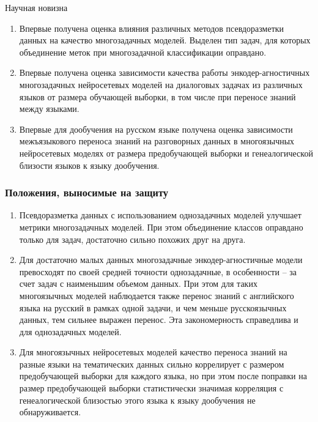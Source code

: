 \begin{frame}{Научная новизна}
\begin{enumerate}
  \item {Впервые получена оценка влияния различных методов псевдоразметки данных на качество многозадачных моделей. Выделен тип задач, для которых объединение меток при многозадачной классификации оправдано.}
  \item {Впервые получена  оценка зависимости качества  работы энкодер-агностичных многозадачных нейросетевых моделей на диалоговых задачах из различных языков от размера обучающей выборки, в том числе при переносе знаний между языками.}
  \item {Впервые для дообучения на русском языке получена оценка зависимости межъязыкового переноса знаний на разговорных данных в многоязычных нейросетевых моделях от размера предобучающей выборки и генеалогической близости языков к языку дообучения.}
\end{enumerate}    
\end{frame}

\begin{frame}
    \frametitle{Положения, выносимые на защиту}
    \begin{enumerate}
  \item {Псевдоразметка данных с использованием однозадачных моделей улучшает метрики многозадачных моделей. При этом объединение классов оправдано только для задач, достаточно сильно похожих друг на друга.}
  \item {Для достаточно малых данных многозадачные энкодер-агностичные модели превосходят по своей средней точности однозадачные, в особенности -- за счет задач с наименьшим объемом данных. При этом для таких многоязычных моделей наблюдается также перенос знаний с английского языка на русский в рамках одной задачи, и чем меньше русскоязычных данных, тем сильнее выражен перенос. Эта закономерность справедлива и для однозадачных моделей.}
  \item {Для многоязычных нейросетевых моделей качество переноса знаний на разные языки на тематических данных сильно коррелирует с размером предобучающей выборки для каждого языка, но при этом после поправки на размер предобучающей выборки статистически значимая корреляция с генеалогической близостью этого языка к языку дообучения не обнаруживается.}
    \end{enumerate}
\end{frame}

